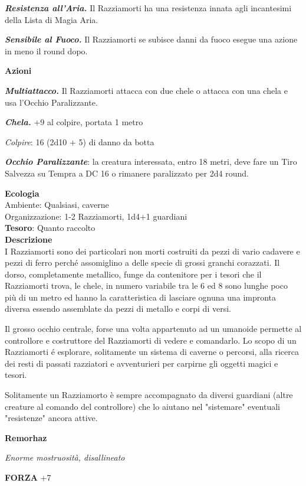 \begin{multicols}{2}
\textit{\textbf{Resistenza all'Aria.}} Il Razziamorti ha una resistenza innata agli incantesimi della Lista di Magia Aria.

\textit{\textbf{Sensibile al Fuoco.}} Il Razziamorti se subisce danni da fuoco esegue una azione in meno il round dopo.

\textbf{Azioni}

\textit{\textbf{Multiattacco.}} Il Razziamorti attacca con due chele o attacca con una chela e usa l'Occhio Paralizzante.

\textbf{\textit{Chela.}} +9 al colpire, portata 1 metro

\textit{Colpire}: 16 (2d10 + 5) di danno da botta

\textit{\textbf{Occhio Paralizzante}}: la creatura interessata, entro 18 metri, deve fare un Tiro Salvezza su Tempra a DC 16 o rimanere paralizzato per 2d4 round.

\textbf{Ecologia}\\
Ambiente: Qualsiasi, caverne\\
Organizzazione: 1-2 Razziamorti, 1d4+1 guardiani\\
\textbf{Tesoro}: Quanto raccolto\\
\textbf{Descrizione}\\
I Razziamorti sono dei particolari non morti costruiti da pezzi di vario cadavere e pezzi di ferro perché assomiglino a delle specie di grossi granchi corazzati.
Il dorso, completamente metallico, funge da contenitore per i tesori che il Razziamorti trova, le chele, in numero variabile tra le 6 ed 8 sono lunghe poco più di un metro ed hanno la caratteristica di lasciare ognuna una impronta diversa essendo assemblate da pezzi di metallo e corpi di versi.

Il grosso occhio centrale, forse una volta appartenuto ad un umanoide permette al controllore e costruttore del Razziamorti di vedere e comandarlo. Lo scopo di un Razziamorti é esplorare, solitamente un sistema di caverne o percorsi, alla ricerca dei resti di passati razziatori e avventurieri per carpirne gli oggetti magici e tesori.

Solitamente un Razziamorto è sempre accompagnato da diversi guardiani (altre creature al comando del controllore) che lo aiutano nel "sistemare" eventuali "resistenze" ancora attive.


\medskip{}\textbf{Remorhaz}

\textit{Enorme mostruosità, disallineato}

\textbf{FORZA} +7


\end{multicols}
